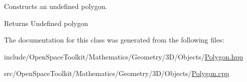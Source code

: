 Constructs an undefined polygon. 

\begin{DoxyReturn}{Returns}
Undefined polygon 
\end{DoxyReturn}


The documentation for this class was generated from the following files\+:\begin{DoxyCompactItemize}
\item 
include/\+Open\+Space\+Toolkit/\+Mathematics/\+Geometry/3\+D/\+Objects/\hyperlink{3_d_2_objects_2_polygon_8hpp}{Polygon.\+hpp}\item 
src/\+Open\+Space\+Toolkit/\+Mathematics/\+Geometry/3\+D/\+Objects/\hyperlink{3_d_2_objects_2_polygon_8cpp}{Polygon.\+cpp}\end{DoxyCompactItemize}
